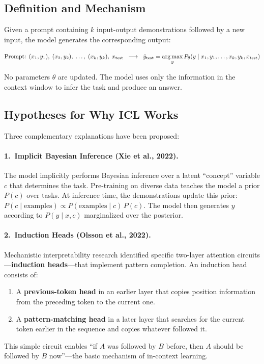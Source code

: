 \subsection{Definition and Mechanism}

Given a prompt containing $k$ input-output demonstrations followed by a new
input, the model generates the corresponding output:

\begin{equation}
\text{Prompt: } (x_1, y_1),\; (x_2, y_2),\; \ldots,\; (x_k, y_k),\; x_{\text{test}}
\;\;\longrightarrow\;\;
\hat{y}_{\text{test}} = \operatorname*{arg\,max}_{y} P_\theta(y \mid x_1, y_1, \ldots, x_k, y_k, x_{\text{test}})
\label{eq:icl}
\end{equation}

No parameters $\theta$ are updated.  The model uses only the information in
the context window to infer the task and produce an answer.

\subsection{Hypotheses for Why ICL Works}

Three complementary explanations have been proposed:

\paragraph{1.\ Implicit Bayesian Inference (Xie et al., 2022).}
The model implicitly performs Bayesian inference over a latent ``concept''
variable $c$ that determines the task.  Pre-training on diverse data teaches
the model a prior $P(c)$ over tasks.  At inference time, the demonstrations
update this prior: $P(c \mid \text{examples}) \propto P(\text{examples} \mid c)
\, P(c)$.  The model then generates $y$ according to $P(y \mid x, c)$
marginalized over the posterior.

\paragraph{2.\ Induction Heads (Olsson et al., 2022).}
Mechanistic interpretability research identified specific two-layer attention
circuits---\textbf{induction heads}---that implement pattern completion.  An
induction head consists of:
\begin{enumerate}[leftmargin=*]
\item A \textbf{previous-token head} in an earlier layer that copies position
  information from the preceding token to the current one.
\item A \textbf{pattern-matching head} in a later layer that searches for
  the current token earlier in the sequence and copies whatever followed it.
\end{enumerate}
This simple circuit enables ``if $A$ was followed by $B$ before, then $A$
should be followed by $B$ now''---the basic mechanism of in-context learning.

